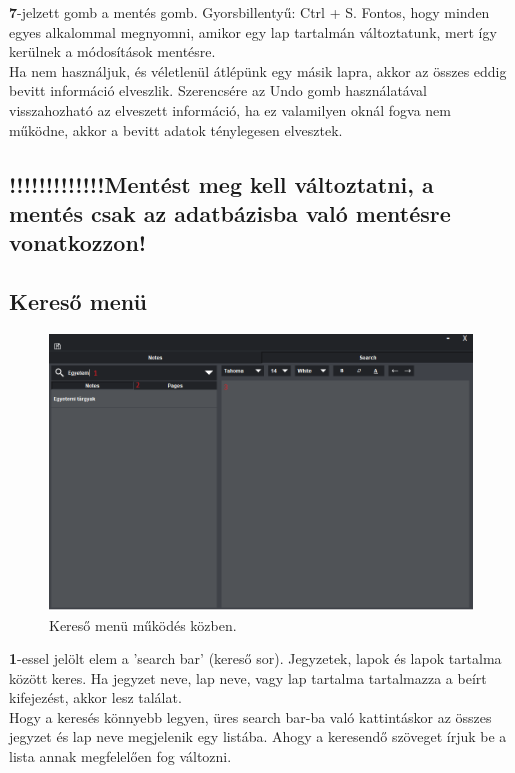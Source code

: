 \vspace{5pt} \noindent \textbf{7}-jelzett gomb a mentés gomb. Gyorsbillentyű: Ctrl + S. Fontos, hogy minden egyes alkalommal megnyomni, amikor egy lap tartalmán változtatunk, mert így kerülnek a módosítások mentésre. 
\vspace{5pt} \\Ha nem használjuk, és véletlenül átlépünk egy másik lapra, akkor az összes eddig bevitt információ elveszlik. Szerencsére az Undo gomb használatával visszahozható az elveszett információ, ha ez valamilyen oknál fogva nem működne, akkor a bevitt adatok ténylegesen elvesztek.
\subsection{!!!!!!!!!!!!!Mentést meg kell változtatni, a mentés csak az adatbázisba való mentésre vonatkozzon!}



\newpage \subsection{Kereső menü}

\begin{figure}[h]
	\centering
	\includegraphics[scale=0.7]{images/doc_4.png}
	\caption{Kereső menü működés közben.}
	\label{fig:menu_search}
\end{figure}

\vspace{5pt} \noindent \textbf{1}-essel jelölt elem a ’search bar’ (kereső sor). Jegyzetek, lapok és lapok tartalma között keres. Ha jegyzet neve, lap neve, vagy lap tartalma tartalmazza a beírt kifejezést, akkor lesz találat. 
\vspace{5pt} \\Hogy a keresés könnyebb legyen, üres search bar-ba való kattintáskor az összes jegyzet és lap neve megjelenik egy listába. Ahogy a keresendő szöveget írjuk be a lista annak megfelelően fog változni. 


